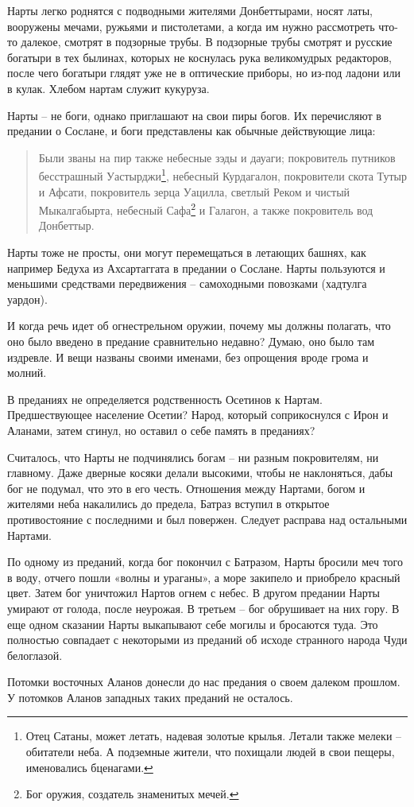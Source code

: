 Нарты легко роднятся с подводными жителями Донбеттырами, носят латы, вооружены мечами, ружьями и пистолетами, а когда им нужно рассмотреть что-то далекое, смотрят в подзорные трубы. В подзорные трубы смотрят и русские богатыри в тех былинах, которых не коснулась рука великомудрых редакторов, после чего богатыри глядят уже не в оптические приборы, но из-под ладони или в кулак. Хлебом нартам служит кукуруза.

Нарты – не боги, однако приглашают на свои пиры богов. Их перечисляют в предании о Сослане, и боги представлены как обычные действующие лица:

\begin{quotation} 
Были званы на пир также небесные зэды и дауаги; покровитель путников бесстрашный Уастырджи\footnote{Отец Сатаны, может летать, надевая золотые крылья. Летали также мелеки – обитатели неба. А подземные жители, что похищали людей в свои пещеры, именовались бценагами.}, небесный Курдагалон, покровители скота Тутыр и Афсати, покровитель зерца Уацилла, светлый Реком и чистый Мыкалгабырта, небесный Сафа\footnote{Бог оружия, создатель знаменитых мечей.} и Галагон, а также покровитель вод Донбеттыр.
\end{quotation} 

Нарты тоже не просты, они могут перемещаться в летающих башнях, как например Бедуха из Ахсартаггата в предании о Сослане. Нарты  пользуются и меньшими средствами передвижения – самоходными повозками (хадтулга уардон).

И когда речь идет об огнестрельном оружии, почему мы должны полагать, что оно было введено в предание сравнительно недавно? Думаю, оно было там издревле. И вещи названы своими именами, без опрощения вроде грома и молний.

В преданиях не определяется родственность Осетинов к Нартам. Предшествующее население Осетии? Народ, который соприкоснулся с Ирон и Аланами, затем сгинул, но оставил о себе память в преданиях?
 
Считалось, что Нарты не подчинялись богам – ни разным покровителям, ни главному. Даже дверные косяки делали высокими, чтобы не наклоняться, дабы бог не подумал, что это в его честь. Отношения между Нартами, богом и жителями неба накалились до предела, Батраз вступил в открытое противостояние с последними и был повержен. Следует расправа над остальными Нартами.

По одному из преданий, когда бог покончил с Батразом, Нарты бросили меч того в воду, отчего пошли «волны и ураганы», а море закипело и приобрело красный цвет. Затем бог уничтожил Нартов огнем с небес. В другом предании Нарты умирают от голода, после неурожая. В третьем – бог обрушивает на них гору. В еще одном сказании Нарты выкапывают себе могилы и бросаются туда. Это полностью совпадает с некоторыми из преданий об исходе странного народа Чуди белоглазой.

Потомки восточных Аланов донесли до нас предания о своем далеком прошлом. У потомков Аланов западных таких преданий не осталось.
